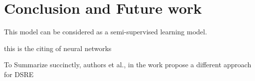 \chapter{Conclusion and Future work}
\label{ch:conclusion}

This model can be considered as a semi-supervised learning model\cite{li2018deeper}.

this is the citing of neural networks\cite{beale1996neural}

To Summarize succinctly, authors  et al., in the work  propose a different approach for DSRE

